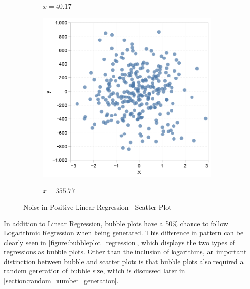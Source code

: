 \begin{figure}
\begin{subfigure}[b]{0.19\textwidth}
        \label{figure: scatter4}
        \caption{\(x = 40.17\)}
    \end{subfigure}
    \hfill
    \begin{subfigure}[b]{0.19\textwidth}
        \centering
        \includegraphics[width=\textwidth]{figures/body/methodology/linear_scatter5.png}
        \label{figure: scatter5}
        \caption{\(x = 355.77\)}
    \end{subfigure}
    \caption{Noise in Positive Linear Regression - Scatter Plot}
    \label{figure:scatterplot_noise_regression}
\end{figure}

In addition to Linear Regression, bubble plots have a 50\% chance to follow Logarithmic Regression when being generated. This difference in pattern can be clearly seen in \autoref{figure:bubbleplot_regression}, which displays the two types of regressions as bubble plots. Other than the inclusion of logarithms, an important distinction between bubble and scatter plots is that bubble plots also required a random generation of bubble size, which is discussed later in \autoref{section:random_number_generation}.

\hfill

